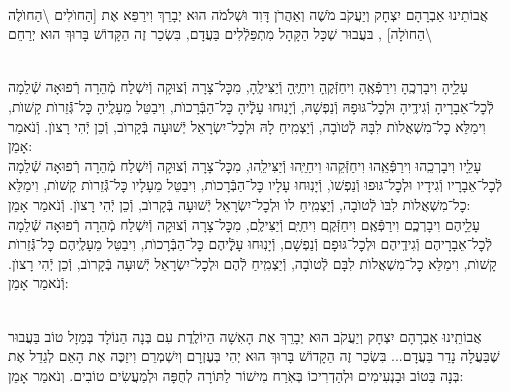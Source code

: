 \documentclass[twoside, openany, parskip=half, 11pt]{book}
\begin{document}
\begin{small}

\\
 אֲבוֹתֵינוּ אַבְרָהָם יִצְחָק וְיַעֲקֹב מֹשֶׁה וְאַהֲרֹן דָּוִד וּשְׁלֹמֹה הוּא יְבָרֵךְ וִירַפֵּא אֶת [הַחוׂלִים \textbackslash הַחוׂלֶה \textbackslash הַחוׂלָה]
,
בּעֲבוּר שְׁכָּל הַקָּהָל מִתְפַּלְֿלִים בַּעֲדָם, בִּשְׂכַר זֶה
 הַקָּדוֹשׁ בָּרוּךְ הוּא יְרַחֵם 
\setcolumnwidth{1.4in,1.4in,1.4in}
\begin{paracol}{3}
	\\
	עָלֵָיהָ וִיבָרְכֶֽהָ וִירַפְּֿאֶֽהָ וִיחַזְּֿקֶֽהָ וִיחַיֶּֽהָ וְֿיַצִּילֶֽהָ, מִכׇּל־צָרָה וְֿצוּקָה וְֿיִשְׁלַח מְֿהֵרָה רְֿפוּאָה שְֿׁלֵמָה לְֿכׇל־אֵבָרָיהָ וְֿגִידֶֽיהָ וּלְכׇל־גּוּפָהּ וְֿנַפְשָׁהּ, וְֿיָנֽוּחוּ עָלְֶֿיהָ כׇּל־הַבְּֿרָכוׂת, וִיבַטֵּל מֵעָלֶֽיהָ כׇּל־גְּֿֿזֵרוׂת קָשׁוׂת, וִימַלֵּא כׇל־מִשְׁאֲלוׂת לִבָּהּ לְֿטוׂבָה, וְֿיַצְמִֽיחַ לָהּ וּלְכׇל־יִשְׂרָאֵל יְֿשׁוּעָה בְּֿקָרוׂב, וְֿכֵן יְֿהִי רָצוׂן. וְֿנֹאמַר אָמֵן:
	\switchcolumn
	\\
	עָלֵָיו וִיבָרְכֵֽהוּ וִירַפְּֿאֵֽהוּ וִיחַזְּֿקֵהוּ וִיחַיֵּֽהוּ וְֿיַצִּילֵֽהוּ, מִכׇּל־צָרָה וְֿצוּקָה וְֿיִשְׁלַח מְֿהֵרָה רְֿפוּאָה שְֿׁלֵמָה לְֿכׇל־אֵבָרָיו וְֿגִידָיו וּלְכׇל־גּוּפוּ וְֿנַפְשׁוׂ, וְֿיָנֽוּחוּ עָלָיו כׇּל־הַבְּֿרָכוׂת, וִיבַטֵּל מֵעָלָיו כׇּל־גְּֿֿזֵרוׂת קָשׁוׂת, וִימַלֵּא כׇל־מִשְׁאֲלוׂת לִבּוׂ לְֿטוׂבָה, וְֿיַצְמִֽיחַ לוׂ וּלְכׇל־יִשְׂרָאֵל יְֿשׁוּעָה בְּֿקָרוׂב, וְֿכֵן יְֿהִי רָצוׂן. וְֿנֹאמַר אָמֵן:
	\switchcolumn
	\\
	עָלֵָיהֶם וִיבָרְכְֶם וִירַפְּֿאֶֽם וִיחַזְּֿקֶֽם וִיחַיֶּֽם וְֿיַצִּילֶֽם, מִכׇּל־צָרָה וְֿצוּקָה וְֿיִשְׁלַח מְֿהֵרָה רְֿפוּאָה שְֿׁלֵמָה לְֿכׇל־אֵבָרָיהֶם וְֿגִידֶֽיהֶם וּלְכׇל־גּוּפָם וְֿנַפְשָׁם, וְֿיָנֽוּחוּ עָלְֶֿיהֶם כׇּל־הַבְּֿרָכוׂת, וִיבַטֵּל מֵעָלֶֽיהֶם כׇּל־גְּֿֿזֵרוׂת קָשׁוׂת, וִימַלֵּא כׇל־מִשְׁאֲלוׂת לִבָּם לְֿטוׂבָה, וְֿיַצְמִֽיחַ לְֿהֶם וּלְכׇל־יִשְׂרָאֵל יְֿשׁוּעָה בְּֿקָרוׂב, וְֿכֵן יְֿהִי רָצוׂן. וְֿנֹאמַר אָמֵן:
\end{paracol}

\vspace{\baselineskip}

\\
אֲבוֹתֵֽינוּ אַבְרָהָם יִצְחָק וְיַעֲקֹב הוּא יְבָרֵךְ אֶת הָאִשָׁה הַיוֹלֶֽדֶת 
 עִם בְּנָה הַנוֹלָד בְּמַזָל טוֹב בַּעֲבוּר שֶׁבַּעֲלָה נָדַר בַּעֲדָם... בִּשְׂכַר זֶה הַקָדוֹשׁ בָּרוּךְ הוּא יְהִי בְּעֶזְרָם וְיִשְׁמְרֵם וִיזַכֶּה אֶת הָאֵם לְגַדֵל אֶת בְּנָה בַּטוֹב וּבַנְעִימִים וּלְהַדְרִיכוֹ בְּאֹֽרַח מִישׁוֹר לַתּוֹרָה לְחֻפָּה וּלְמַעֲשִׂים טוֹבִים. וְנֹאמַר אָמֵן:
 

\end{small}
\end{document}
